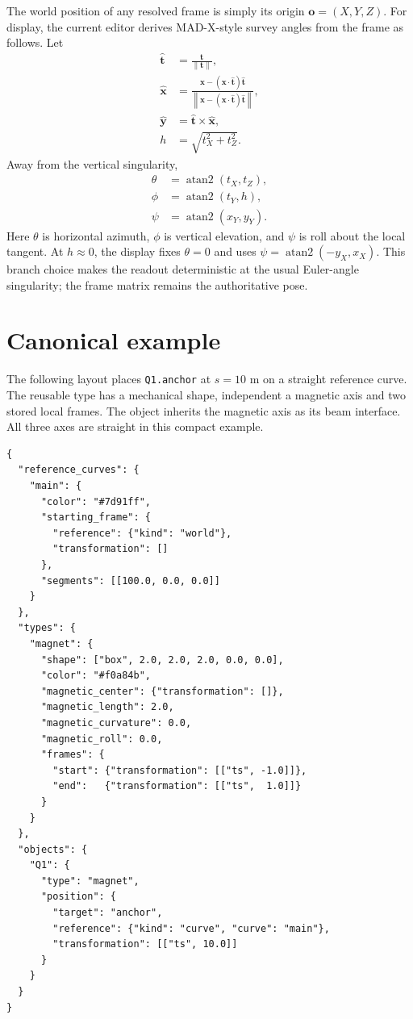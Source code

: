 \documentclass[11pt,a4paper]{article}
\begin{document}
The world position of any resolved frame is simply its origin
$\mathbf{o}=(X,Y,Z)$.  For display, the current editor derives
MAD-X-style survey angles from the frame as follows.  Let
\begin{align}
 \widehat{\mathbf{t}}&=\frac{\mathbf{t}}{\lVert\mathbf{t}\rVert},\\
 \widehat{\mathbf{x}}&=
 \frac{\mathbf{x}-(\mathbf{x}\cdot\widehat{\mathbf{t}})
       \widehat{\mathbf{t}}}
      {\left\lVert\mathbf{x}-(\mathbf{x}\cdot\widehat{\mathbf{t}})
       \widehat{\mathbf{t}}\right\rVert},\\
 \widehat{\mathbf{y}}&=\widehat{\mathbf{t}}\times
                       \widehat{\mathbf{x}},\\
 h&=\sqrt{t_X^2+t_Z^2}.
\end{align}
Away from the vertical singularity,
\begin{align}
 \theta&=\operatorname{atan2}(t_X,t_Z),\\
 \phi&=\operatorname{atan2}(t_Y,h),\\
 \psi&=\operatorname{atan2}(x_Y,y_Y).
 \label{eq:madx-readout}
\end{align}
Here $\theta$ is horizontal azimuth, $\phi$ is vertical elevation, and $\psi$
is roll about the local tangent.  At $h\approx0$, the display fixes
$\theta=0$ and uses
$\psi=\operatorname{atan2}(-y_X,x_X)$.  This branch choice makes the readout
deterministic at the usual Euler-angle singularity; the frame matrix remains the
authoritative pose.

\section{Canonical example}

The following layout places \texttt{Q1.anchor} at $s=10$ m on a straight
reference curve.  The reusable type has a mechanical shape, independent
a magnetic axis and two stored local frames. The object inherits the magnetic
axis as its beam interface. All three axes
are straight in this compact example.

\begin{lstlisting}
{
  "reference_curves": {
    "main": {
      "color": "#7d91ff",
      "starting_frame": {
        "reference": {"kind": "world"},
        "transformation": []
      },
      "segments": [[100.0, 0.0, 0.0]]
    }
  },
  "types": {
    "magnet": {
      "shape": ["box", 2.0, 2.0, 2.0, 0.0, 0.0],
      "color": "#f0a84b",
      "magnetic_center": {"transformation": []},
      "magnetic_length": 2.0,
      "magnetic_curvature": 0.0,
      "magnetic_roll": 0.0,
      "frames": {
        "start": {"transformation": [["ts", -1.0]]},
        "end":   {"transformation": [["ts",  1.0]]}
      }
    }
  },
  "objects": {
    "Q1": {
      "type": "magnet",
      "position": {
        "target": "anchor",
        "reference": {"kind": "curve", "curve": "main"},
        "transformation": [["ts", 10.0]]
      }
    }
  }
}
\end{lstlisting}
\end{document}
